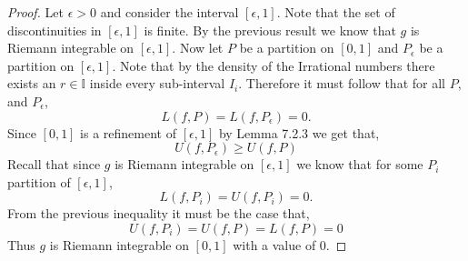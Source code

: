 \documentclass[12pt]{article}
\makeatletter
\theoremstyle{homework}
\newenvironment{exercise}[1]
{\def\@currentlabel{#1}\exercisecore}
{\endexercisecore}
\newcommand{\Irats}{\ensuremath{\mathbb I}}
\makeatother
\begin{document}
\begin{exercise}{Supplemental 1}
\begin{enumerate}
\begin{proof}
		Let $\epsilon >0$ and consider the interval $[\epsilon, 1]$. Note that the set of discontinuities in $[\epsilon, 1]$ is finite. 
		By the previous result we know that $g$ is Riemann integrable on $[\epsilon, 1]$. Now let $P$ be a partition on $[0,1]$ and $P_{\epsilon}$ be a partition on $[\epsilon, 1]$. Note that by the density of the Irrational numbers there exists an $r \in \Irats$ inside every sub-interval $I_i$.
		Therefore it must follow that for all $P$, and $P_\epsilon$,
			\begin{equation*}
			L(f,P) = L(f, P_\epsilon) = 0.
			\end{equation*}
			Since $[0,1]$ is a refinement of $[\epsilon, 1]$ by Lemma 7.2.3 we get that,
			\begin{equation*}
				U(f, P_\epsilon) \geq U(f, P)
			\end{equation*}
			Recall that since $g$ is Riemann integrable on $[\epsilon, 1]$ we know that for some $P_i$ partition of $[\epsilon, 1]$,
		\begin{equation*}
			L(f, P_i) = U(f, P_i) = 0.
		\end{equation*}
		From the previous inequality it must be the case that,
		\begin{equation*}
			U(f, P_i)  =  U(f, P) = L(f,P) = 0 
		\end{equation*}
		Thus $g$ is Riemann integrable on $[0,1]$ with a value of $0$.  
	\end{proof}









\end{enumerate}
\end{exercise}
\end{document}
